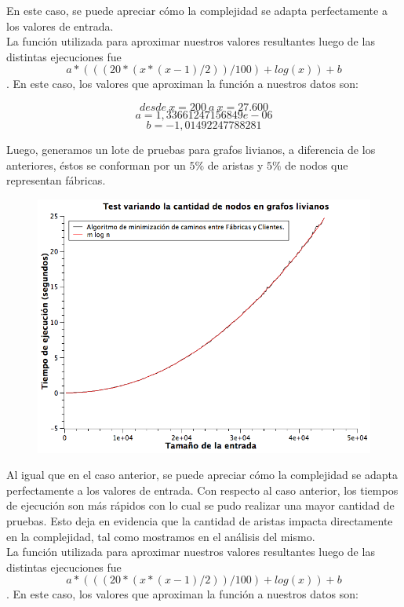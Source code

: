 En este caso, se puede apreciar cómo la complejidad se adapta perfectamente a los valores de entrada.\\
La función utilizada para aproximar nuestros valores resultantes luego de las distintas ejecuciones fue $$a*(((20*(x*(x-1)/2)) / 100) + log(x)) + b$$.
En este caso, los valores que aproximan la función a nuestros datos son:

$$desde\ x = 200\ a\ x = 27.600 $$
$$a  = 1,33661247156849e-06$$
$$b  = -1,01492247788281 $$

Luego, generamos un lote de pruebas para grafos livianos, a diferencia de los anteriores, éstos se conforman por un $5\%$ de aristas y $5\%$ de nodos que representan fábricas.

\begin{figure}[H]
	\includegraphics[width=350pt]{../tests/ej3/EJ3-nodo-var-liviano.png}
\end{figure}

Al igual que en el caso anterior, se puede apreciar cómo la complejidad se adapta perfectamente a los valores de entrada. Con respecto al caso anterior, los tiempos de ejecución son más rápidos con lo cual se pudo realizar una mayor cantidad de pruebas. Esto deja en evidencia que la cantidad de aristas impacta directamente en la complejidad, tal como mostramos en el análisis del mismo.\\
La función utilizada para aproximar nuestros valores resultantes luego de las distintas ejecuciones fue $$ a*(((20*(x*(x-1)/2)) / 100) + log(x)) + b $$.
En este caso, los valores que aproximan la función a nuestros datos son:

